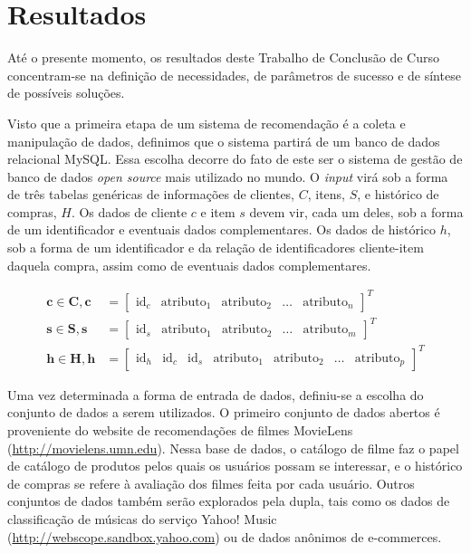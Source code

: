 \chapter[Resultados]{Resultados}
\label{chap:resultados}

Até o presente momento, os resultados deste Trabalho de Conclusão de Curso concentram-se na definição de necessidades, de parâmetros de sucesso e de síntese de possíveis soluções. 

Visto que a primeira etapa de um sistema de recomendação é a coleta e manipulação de dados, definimos que o sistema partirá de um banco de dados relacional MySQL. Essa escolha decorre do fato de este ser o sistema de gestão de banco de dados \textit{open source} mais utilizado no mundo. O \textit{input} virá sob a forma de três tabelas genéricas de informações de clientes, $C$, itens, $S$, e histórico de compras, $H$. Os dados de cliente $c$ e item $s$ devem vir, cada um deles, sob a forma de um identificador e eventuais dados complementares. Os dados de histórico $h$, sob a forma de um identificador e da relação de identificadores cliente-item daquela compra, assim como de eventuais dados complementares. 

\begin{equation} 
\begin{split} 
\mathbf{c} \in \mathbf{C}, \mathbf{c} &= 
\begin{bmatrix} 
 \textrm{id}_c &  \textrm{atributo}_1 &  \textrm{atributo}_2 & \dots &  \textrm{atributo}_n 
\end{bmatrix}^T \\
\mathbf{s} \in \mathbf{S}, \mathbf{s} &= 
\begin{bmatrix} 
 \textrm{id}_s &  \textrm{atributo}_1 &  \textrm{atributo}_2 & \dots &  \textrm{atributo}_m 
\end{bmatrix}^T \\
\mathbf{h} \in \mathbf{H}, \mathbf{h} &= 
\begin{bmatrix} 
 \textrm{id}_h &  \textrm{id}_c &  \textrm{id}_s &  \textrm{atributo}_1 &  \textrm{atributo}_2 & \dots &  \textrm{atributo}_p 
\end{bmatrix}^T
\end{split} 
\end{equation}

Uma vez determinada a forma de entrada de dados, definiu-se a escolha do conjunto de dados a serem utilizados. O primeiro conjunto de dados abertos é proveniente do website de recomendações de filmes MovieLens (\url{http://movielens.umn.edu}). Nessa base de dados, o catálogo de filme faz o papel de catálogo de produtos pelos quais os usuários possam se interessar, e o histórico de compras se refere à avaliação dos filmes feita por cada usuário. Outros conjuntos de dados também serão  explorados pela dupla, tais como os dados de classificação de músicas do serviço Yahoo! Music (\url{http://webscope.sandbox.yahoo.com}) ou de dados anônimos de e-commerces.

